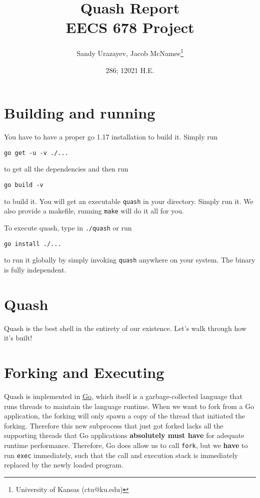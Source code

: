 \documentclass[12pt]{article}
\author{Sandy Urazayev, Jacob McNamee\thanks{University of Kansas (ctu@ku.edu)}}
\date{286; 12021 H.E.}
\title{Quash Report\\\medskip
\large EECS 678 Project \rom{1}}
\begin{document}
\maketitle
\tableofcontents


\section{Building and running}
\label{sec:org419df39}
You have to have a proper go 1.17 installation to build it. Simply run
\begin{verbatim}
go get -u -v ./...
\end{verbatim}
to get all the dependencies and then run
\begin{verbatim}
go build -v
\end{verbatim}
to build it. You will get an executable \texttt{quash} in your directory. Simply run
it. We also provide a makefile, running \texttt{make} will do it all for you.

To execute quash, type in \texttt{./quash} or run
\begin{verbatim}
go install ./...
\end{verbatim}
to run it globally by simply invoking \texttt{quash} anywhere on your system. The
binary is fully independent.
\section{Quash}
\label{sec:org930372a}
Quash is the best shell in the entirety of our existence. Let's walk through
how it's built!
\section{Forking and Executing}
\label{sec:orgf6a981b}
Quash is implemented in \href{https://golang.org}{Go}, which itself is a garbage-collected language that
runs threads to maintain the language runtime. When we want to fork from a Go
application, the forking will only spawn a copy of the thread that initiated
the forking. Therefore this new subprocess that just got forked lacks all the
supporting threads that Go applications \textbf{absolutely must have} for adequate
runtime performance. Therefore, Go does allow us to call \texttt{fork}, but we \textbf{have} to
run \texttt{exec} immediately, such that the call and execution stack is immediately
replaced by the newly loaded program.
\end{document}
